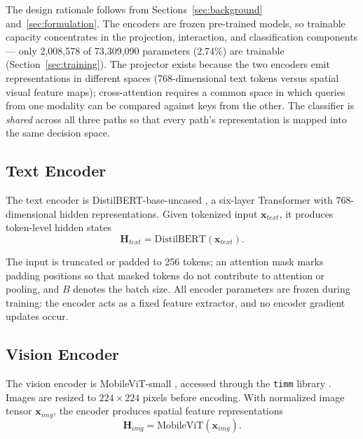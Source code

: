 \documentclass[10pt,twoside]{article}
\newcommand{\code}[1]{\texttt{#1}}
\begin{document}
The design rationale follows from Sections~\ref{sec:background} and~\ref{sec:formulation}. The encoders are frozen pre-trained models, so trainable capacity concentrates in the projection, interaction, and classification components --- only 2,008,578 of 73,309,090 parameters (2.74\%) are trainable (Section~\ref{sec:training}). The projector exists because the two encoders emit representations in different spaces (768-dimensional text tokens versus spatial visual feature maps); cross-attention requires a common space in which queries from one modality can be compared against keys from the other. The classifier is \emph{shared} across all three paths so that every path's representation is mapped into the same decision space.

\subsection{Text Encoder}\label{sec:text-encoder}

The text encoder is DistilBERT-base-uncased \citep{sanh2019distilbert}, a six-layer Transformer with 768-dimensional hidden representations. Given tokenized input $\mathbf{x}_{text}$, it produces token-level hidden states
\begin{equation}\label{eq:htext}
\mathbf{H}_{text} = \text{DistilBERT}(\mathbf{x}_{text}).
\end{equation}

The input is truncated or padded to 256 tokens; an attention mask marks padding positions so that masked tokens do not contribute to attention or pooling, and $B$ denotes the batch size. All encoder parameters are frozen during training: the encoder acts as a fixed feature extractor, and no encoder gradient updates occur.

\subsection{Vision Encoder}\label{sec:vision-encoder}

The vision encoder is MobileViT-small \citep{mehta2022mobilevit}, accessed through the \code{timm} library \citep{wightman2019timm}. Images are resized to $224 \times 224$ pixels before encoding. With normalized image tensor $\mathbf{x}_{img}$, the encoder produces spatial feature representations
\begin{equation}\label{eq:himg}
\mathbf{H}_{img} = \text{MobileViT}(\mathbf{x}_{img}).
\end{equation}
\end{document}
